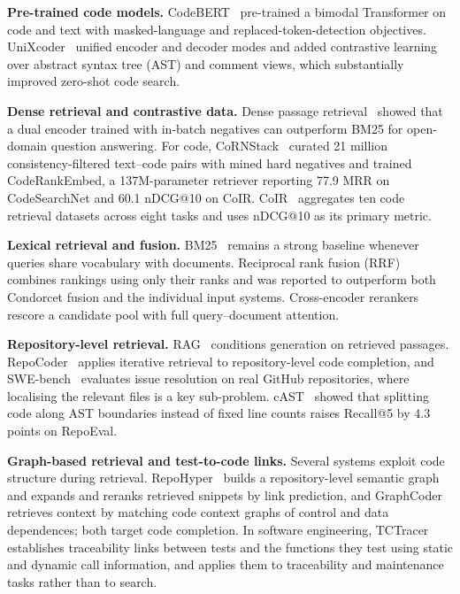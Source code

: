 \documentclass[conference]{IEEEtran}
\begin{document}
\textbf{Pre-trained code models.} CodeBERT~\cite{feng2020codebert} pre-trained
a bimodal Transformer on code and text with masked-language and
replaced-token-detection objectives. UniXcoder~\cite{guo2022unixcoder} unified
encoder and decoder modes and added contrastive learning over abstract syntax
tree (AST) and comment views, which substantially improved zero-shot code
search.

\textbf{Dense retrieval and contrastive data.} Dense passage
retrieval~\cite{karpukhin2020dpr} showed that a dual encoder trained with
in-batch negatives can outperform BM25 for open-domain question answering.
For code, CoRNStack~\cite{suresh2025cornstack} curated 21 million
consistency-filtered text--code pairs with mined hard negatives and trained
CodeRankEmbed, a 137M-parameter retriever reporting 77.9 MRR on CodeSearchNet
and 60.1 nDCG@10 on CoIR. CoIR~\cite{li2025coir} aggregates ten code retrieval
datasets across eight tasks and uses nDCG@10 as its primary metric.

\textbf{Lexical retrieval and fusion.} BM25~\cite{robertson2009bm25} remains a
strong baseline whenever queries share vocabulary with documents. Reciprocal
rank fusion (RRF)~\cite{cormack2009rrf} combines rankings using only their
ranks and was reported to outperform both Condorcet fusion and the individual
input systems. Cross-encoder rerankers~\cite{nogueira2019passage} rescore a
candidate pool with full query--document attention.

\textbf{Repository-level retrieval.} RAG~\cite{lewis2020rag} conditions
generation on retrieved passages. RepoCoder~\cite{zhang2023repocoder} applies
iterative retrieval to repository-level code completion, and
SWE-bench~\cite{jimenez2024swebench} evaluates issue resolution on real GitHub
repositories, where localising the relevant files is a key sub-problem. cAST~\cite{zhang2025cast}
showed that splitting code along AST boundaries instead of fixed line counts
raises Recall@5 by 4.3 points on RepoEval.

\textbf{Graph-based retrieval and test-to-code links.} Several systems
exploit code structure during retrieval. RepoHyper~\cite{phan2024repohyper}
builds a repository-level semantic graph and expands and reranks retrieved
snippets by link prediction, and GraphCoder~\cite{liu2024graphcoder} retrieves
context by matching code context graphs of control and data dependences; both
target code completion. In software engineering, TCTracer~\cite{white2022tctracer}
establishes traceability links between tests and the functions they test using
static and dynamic call information, and applies them to traceability and
maintenance tasks rather than to search.
\end{document}
